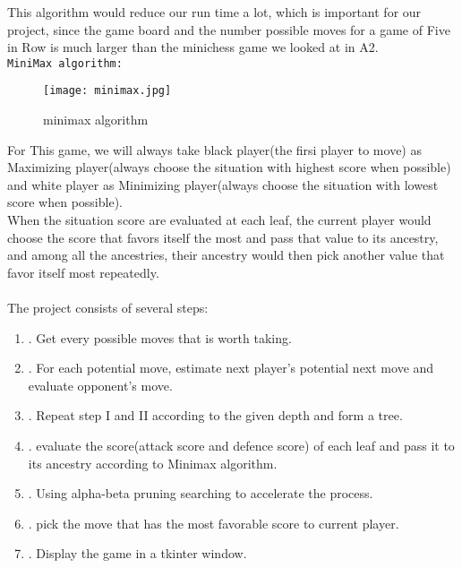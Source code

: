 \documentclass[fontsize=11pt]{article}
\begin{document}
This algorithm would reduce our run time a lot, which is important for our project, since the game board and the number possible moves for a game of Five in Row is much larger than the minichess game we looked at in A2. \\

\textbullet \hspace{2mm} \texttt{MiniMax algorithm:}\\

\begin{figure}[h]
    \centering
    \texttt{[image: minimax.jpg]}
    \caption{minimax algorithm}
    \label{fig:my_label}
\end{figure}

For This game, we will always take black player(the firsi player to move) as Maximizing player(always choose the situation with highest score when possible) and white player as Minimizing player(always choose the situation with lowest score when possible).\\

When the situation score are evaluated at each leaf, the current player would choose the score that favors itself the most and pass that value to its ancestry, and among all the ancestries, their ancestry would then pick another value that favor itself most repeatedly. \\

\\
The project consists of several steps:

\begin{enumerate}[I]
    \item. Get every possible moves that is worth taking.
    \item. For each potential move, estimate next player's potential next move and evaluate opponent's move. 
    \item. Repeat step I and II according to the given depth and form a tree.
    \item. evaluate the score(attack score and defence score) of each leaf and pass it to its ancestry according to Minimax algorithm.
    \item. Using alpha-beta pruning searching to accelerate the process.
    \item. pick the move that has the most favorable score to current player.
    \item. Display the game in a tkinter window.
    
\end{enumerate}
\end{document}
